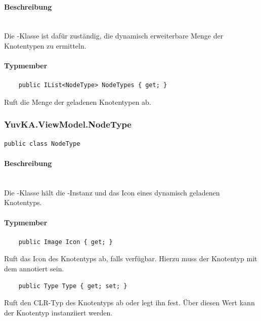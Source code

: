 \paragraph{Beschreibung}~\\
Die -Klasse ist dafür zuständig, die dynamisch erweiterbare Menge der Knotentypen zu ermitteln.

\paragraph{Typmember}
\begin{itemize}

	\begin{verbatim}
	public IList<NodeType> NodeTypes { get; }
	\end{verbatim}
	Ruft die Menge der geladenen Knotentypen ab.

\end{itemize}

\subsubsection{YuvKA.ViewModel.NodeType}

\begin{verbatim}
public class NodeType
\end{verbatim}

\paragraph{Beschreibung}~\\
Die -Klasse hält die -Instanz und das Icon eines dynamisch geladenen Knotentyps.

\paragraph{Typmember}
\begin{itemize}

	\begin{verbatim}
	public Image Icon { get; }
	\end{verbatim}
	Ruft das Icon des Knotentyps ab, falls verfügbar. Hierzu muss der Knotentyp mit dem  annotiert sein.

	\begin{verbatim}
	public Type Type { get; set; }
	\end{verbatim}
	Ruft den CLR-Typ des Knotentyps ab oder legt ihn fest. Über diesen Wert kann der Knotentyp instanziiert werden.

\end{itemize}
